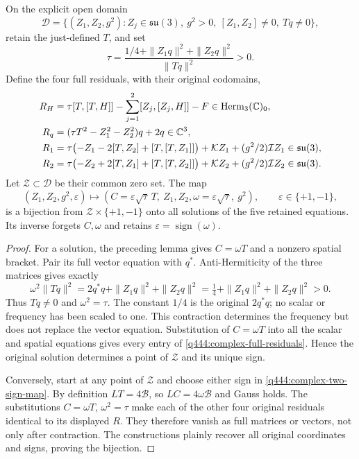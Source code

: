 \begin{theorem}
\label{q444:complex-exact-zero-set}
On the explicit open domain
\[
 \mathcal D=\{(Z_1,Z_2,g^2):Z_j\in\mathfrak{su}(3),\ g^2>0,
       \ [Z_1,Z_2]\ne0,\ Tq\ne0\},
\]
retain the just-defined $T$, and set
\begin{equation}\label{q444:complex-frequency}
 \tau=\frac{1/4+\|Z_1q\|^2+\|Z_2q\|^2}{\|Tq\|^2}>0.
\end{equation}
Define the four full residuals, with their original codomains,
\begin{align}
 R_H&=\tau[T,[T,H]]-\sum_{j=1}^2[Z_j,[Z_j,H]]-F
             \in\operatorname{Herm}_3(\mathbb C)_0,\notag\\
 R_q&=(\tau T^2-Z_1^2-Z_2^2)q+2q\in\mathbb C^3,\notag\\
 R_1&=\tau\bigl(-Z_1-2[T,Z_2]+[T,[T,Z_1]]\bigr)
                 +\mathcal KZ_1+(g^2/2)\mathcal IZ_1
                  \in\mathfrak{su}(3),\notag\\
 R_2&=\tau\bigl(-Z_2+2[T,Z_1]+[T,[T,Z_2]]\bigr)
                 +\mathcal KZ_2+(g^2/2)\mathcal IZ_2
                  \in\mathfrak{su}(3).
 \label{q444:complex-full-residuals}
\end{align}
Let $\mathcal Z\subset\mathcal D$ be their common zero set. The map
\begin{equation}\label{q444:complex-two-sign-map}
 (Z_1,Z_2,g^2,\varepsilon)\longmapsto
 \left(C=\varepsilon\sqrt\tau\,T,\ Z_1,Z_2,
       \omega=\varepsilon\sqrt\tau,\ g^2\right),
 \qquad\varepsilon\in\{+1,-1\},
\end{equation}
is a bijection from $\mathcal Z\times\{+1,-1\}$ onto all solutions
of the five retained equations. Its inverse forgets $C,\omega$ and
retains $\varepsilon=\operatorname{sign}(\omega)$.
\end{theorem}
\begin{proof}
For a solution, the preceding lemma gives $C=\omega T$ and a
nonzero spatial bracket. Pair its full vector equation with $q^*$.
Anti-Hermiticity of the three matrices gives exactly
\[
 \omega^2\|Tq\|^2
       =2q^*q+\|Z_1q\|^2+\|Z_2q\|^2
       =\tfrac14+\|Z_1q\|^2+\|Z_2q\|^2>0.
\]
Thus $Tq\ne0$ and $\omega^2=\tau$. The constant $1/4$ is the
original $2q^*q$; no scalar or frequency has been scaled to one.
This contraction determines the frequency but does not replace
the vector equation. Substitution of $C=\omega T$ into all the
scalar and spatial equations gives every entry of
\eqref{q444:complex-full-residuals}. Hence the original solution
determines a point of $\mathcal Z$ and its unique sign.

Conversely, start at any point of $\mathcal Z$ and choose either
sign in \eqref{q444:complex-two-sign-map}. By definition
$LT=4\mathscr B$, so $LC=4\omega\mathscr B$ and Gauss holds.
The substitutions $C=\omega T$, $\omega^2=\tau$ make each of the
other four original residuals identical to its displayed $R$.
They therefore vanish as full matrices or vectors, not only after
contraction. The constructions plainly recover all original
coordinates and signs, proving the bijection.
\end{proof}

